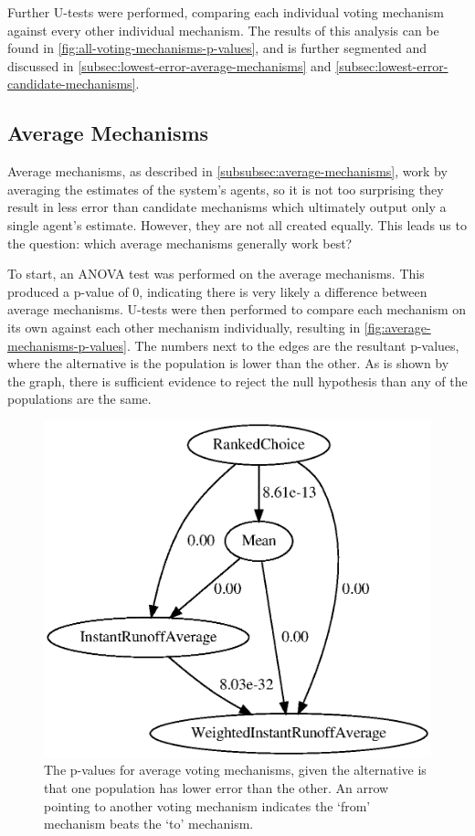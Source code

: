 Further U-tests were performed, comparing each individual voting mechanism against
every other individual mechanism.
The results of this analysis can be found in
\autoref{fig:all-voting-mechanisms-p-values}, and is further segmented and discussed in
\autoref{subsec:lowest-error-average-mechanisms} and
\autoref{subsec:lowest-error-candidate-mechanisms}.

\subsection{Average Mechanisms}\label{subsec:lowest-error-average-mechanisms}
Average mechanisms, as described in \autoref{subsubsec:average-mechanisms}, work by
averaging the estimates of the system's agents, so it is not too surprising they
result in less error than candidate mechanisms which ultimately output only a single
agent's estimate.
However, they are not all created equally.
This leads us to the question: which average mechanisms generally work best?

To start, an ANOVA test was performed on the average mechanisms.
This produced a p-value of 0, indicating there is very likely a difference between
average mechanisms.
U-tests were then performed to compare each mechanism on its own against each other
mechanism individually, resulting in \autoref{fig:average-mechanisms-p-values}.
The numbers next to the edges are the resultant p-values, where the alternative is
the population is lower than the other.
As is shown by the graph, there is sufficient evidence to reject the null hypothesis
than any of the populations are the same.

\begin{figure}[htbp]
    \centering
    \includegraphics[scale=0.75]
    {./content/figures/voting_mechanisms/average-mechanisms-p-values.gv}
    \caption{The p-values for average voting mechanisms, given the alternative is
    that one population has lower error than the other.
    An arrow pointing to another voting mechanism indicates the `from' mechanism
    beats the `to' mechanism.}
    \label{fig:average-mechanisms-p-values}
\end{figure}

